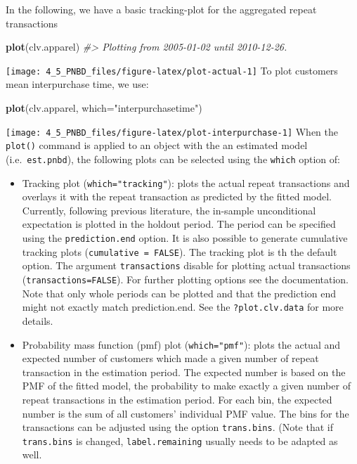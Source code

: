 \documentclass[
]{article}
\newenvironment{Shaded}{\begin{snugshade}}{\end{snugshade}}
\newcommand{\AttributeTok}[1]{\textcolor[rgb]{0.13,0.29,0.53}{#1}}
\newcommand{\CommentTok}[1]{\textcolor[rgb]{0.56,0.35,0.01}{\textit{#1}}}
\newcommand{\FunctionTok}[1]{\textcolor[rgb]{0.13,0.29,0.53}{\textbf{#1}}}
\newcommand{\NormalTok}[1]{#1}
\newcommand{\StringTok}[1]{\textcolor[rgb]{0.31,0.60,0.02}{#1}}
\providecommand{\tightlist}{%
  \setlength{\itemsep}{0pt}\setlength{\parskip}{0pt}}
\begin{document}
In the following, we have a basic tracking-plot for the aggregated
repeat transactions

\begin{Shaded}
\begin{Highlighting}[]
\FunctionTok{plot}\NormalTok{(clv.apparel)}
\CommentTok{\#\textgreater{} Plotting from 2005{-}01{-}02 until 2010{-}12{-}26.}
\end{Highlighting}
\end{Shaded}

\texttt{[image: 4\_5\_PNBD\_files/figure-latex/plot-actual-1]}
To plot customers mean interpurchase time, we use:

\begin{Shaded}
\begin{Highlighting}[]
\FunctionTok{plot}\NormalTok{(clv.apparel, }\AttributeTok{which=}\StringTok{"interpurchasetime"}\NormalTok{)}
\end{Highlighting}
\end{Shaded}

\texttt{[image: 4\_5\_PNBD\_files/figure-latex/plot-interpurchase-1]}
When the \texttt{plot()} command is applied to an object with the an
estimated model (i.e.~\texttt{est.pnbd}), the following plots can be
selected using the \texttt{which} option of:

\begin{itemize}
\tightlist
\item
  Tracking plot (\texttt{which="tracking"}): plots the actual repeat
  transactions and overlays it with the repeat transaction as predicted
  by the fitted model. Currently, following previous literature, the
  in-sample unconditional expectation is plotted in the holdout period.
  The period can be specified using the \texttt{prediction.end} option.
  It is also possible to generate cumulative tracking plots
  (\texttt{cumulative\ =\ FALSE}). The tracking plot is th the default
  option. The argument \texttt{transactions} disable for plotting actual
  transactions (\texttt{transactions=FALSE}). For further plotting
  options see the documentation. Note that only whole periods can be
  plotted and that the prediction end might not exactly match
  prediction.end. See the \texttt{?plot.clv.data} for more details.
\item
  Probability mass function (pmf) plot (\texttt{which="pmf"}): plots the
  actual and expected number of customers which made a given number of
  repeat transaction in the estimation period. The expected number is
  based on the PMF of the fitted model, the probability to make exactly
  a given number of repeat transactions in the estimation period. For
  each bin, the expected number is the sum of all customers' individual
  PMF value. The bins for the transactions can be adjusted using the
  option \texttt{trans.bins}. (Note that if \texttt{trans.bins} is
  changed, \texttt{label.remaining} usually needs to be adapted as well.
\end{itemize}
\end{document}
